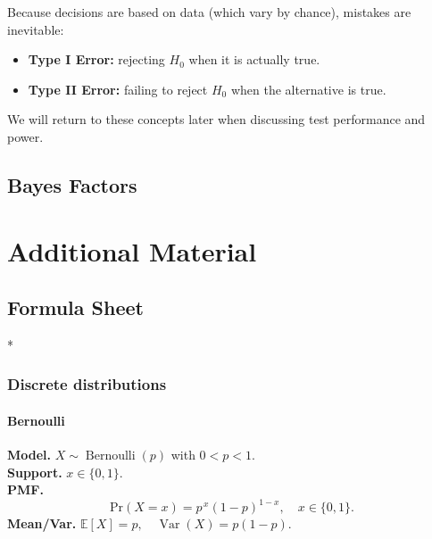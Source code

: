 \documentclass[
  letterpaper,
  DIV=11,
  numbers=noendperiod]{scrreprt}
\makeatletter
\let\oldsubparagraph\subparagraph
\renewcommand{\subparagraph}{
    \@ifstar
      \xxxSubParagraphStar
      \xxxSubParagraphNoStar
  }
\newcommand{\xxxSubParagraphStar}[1]{\oldsubparagraph*{#1}\mbox{}}
\newcommand{\xxxSubParagraphNoStar}[1]{\oldsubparagraph{#1}\mbox{}}
\providecommand{\tightlist}{%
  \setlength{\itemsep}{0pt}\setlength{\parskip}{0pt}}
\theoremstyle{definition}
\theoremstyle{plain}
\theoremstyle{definition}
\theoremstyle{remark}
\makeatother
\begin{document}
Because decisions are based on data (which vary by chance), mistakes are
inevitable:

\begin{itemize}
\tightlist
\item
  \textbf{Type I Error:} rejecting \(H_0\) when it is actually true.
\item
  \textbf{Type II Error:} failing to reject \(H_0\) when the alternative
  is true.
\end{itemize}

We will return to these concepts later when discussing test performance
and power.

\chapter{Bayes Factors}\label{bayes-factors}

\part{Additional Material}

\chapter*{Formula Sheet}\label{sec-formula-sheet}


\subparagraph*{}\label{sec-formula-sheet}

\section*{Discrete distributions}\label{discrete-distributions}


\subsection*{Bernoulli}\label{sec-bern}

\textbf{Model.} \(X \sim \operatorname{Bernoulli}(p)\) with \(0<p<1\).\\
\textbf{Support.} \(x \in \{0,1\}\).\\
\textbf{PMF.} \[
\mathrm{Pr}(X=x) = p^{\,x}(1-p)^{1-x}, \quad x\in\{0,1\}.
\] \textbf{Mean/Var.}
\(\mathbb{E}[X]=p,\quad \operatorname{Var}(X)=p(1-p).\)
\end{document}
